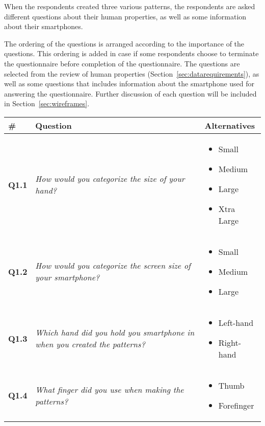     When the respondents created three various patterns, the respondents are asked different questions about their human properties, as well as some information about their smartphones. 

    The ordering of the questions is arranged according to the importance of the questions. This ordering is added in case if some respondents choose to terminate the questionnaire before completion of the questionnaire. The questions are selected from the review of human properties (Section~\ref{sec:datarequirements}), as well as some questions that includes information about the smartphone used for answering the questionnaire. Further discussion of each question will be included in Section~\ref{sec:wireframes}.

    \begin{longtable}{| p{1cm} | m{6.5cm} | m{3.5cm} |}
      \hline
      {\bf \#} & {\bf Question} & {\bf Alternatives} \\ \hline
      {\bf Q1.1} & 
      {\it How would you categorize the size of your hand?} & 
      \begin{itemize}
        \item Small
        \item Medium
        \item Large
        \item Xtra Large
      \end{itemize} 
      \\ \hline

      {\bf Q1.2} & 
      {\it How would you categorize the screen size of your smartphone?} &
      \begin{itemize}
        \item Small
        \item Medium
        \item Large
      \end{itemize} 
      \\ \hline

      {\bf Q1.3} & 
      {\it Which hand did you hold you smartphone in when you created the patterns?} & 
      \begin{itemize}
        \item Left-hand
        \item Right-hand
      \end{itemize} \\ \hline

      {\bf Q1.4} & 
      {\it What finger did you use when making the patterns?} &
      \begin{itemize}
        \item Thumb
        \item Forefinger
      \end{itemize}  \\ \hline


\end{longtable}

